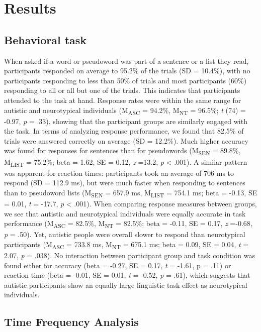 \section*{Results}
\subsection*{Behavioral task}
When asked if a word or pseudoword was part of a sentence or a list they read, participants responded on average to 95.2\% of the trials (SD = 10.4\%), with no participants responding to less than 50\% of trials and most participants (60\%) responding to all or all but one of the trials. This indicates that participants attended to the task at hand. Response rates were within the same range for autistic and neurotypical individuals (M\textsubscript{ASC} = 94.2\%,  M\textsubscript{NT} = 96.5\%; \textit{t} (74) = -0.97, \textit{p} = .33), showing that the participant groups are similarly engaged with the task. In terms of analyzing response performance, we found that 82.5\% of trials were answered correctly on average (SD = 12.2\%). Much higher accuracy was found for responses for sentences than for pseudowords (M\textsubscript{SEN} = 89.8\%,  M\textsubscript{LIST} = 75.2\%; beta = 1.62, SE = 0.12, \textit{z} =13.2, \textit{p} <  .001). A similar pattern was apparent for reaction times: participants took an average of 706 ms to respond (SD = 112.9 ms), but were much faster when responding to sentences than to pseudoword lists (M\textsubscript{SEN} = 657.9 ms,  M\textsubscript{LIST} = 754.1 ms; beta =  -0.13, SE = 0.01, \textit{t} = -17.7, \textit{p} <  .001). When comparing response measures between groups, we see that autistic and neurotypical individuals were equally accurate in task performance  (M\textsubscript{ASC} = 82.5\%,  M\textsubscript{NT} = 82.5\%; beta = -0.11, SE = 0.17, \textit{z} =-0.68, \textit{p} = .50). Yet, autistic people were overall slower to respond than neurotypical participants (M\textsubscript{ASC} = 733.8 ms,  M\textsubscript{NT} = 675.1 ms; beta = 0.09, SE = 0.04, \textit{t} = 2.07, \textit{p} = .038). No interaction between participant group and task condition was found either for accuracy (beta = -0.27, SE = 0.17, \textit{t} = -1.61, p  = .11) or reaction time (beta = -0.01, SE = 0.01, \textit{t} = -0.52, \textit{p} = .61), which suggests that autistic participants show an equally large linguistic task effect as neurotypical individuals.


\subsection*{Time Frequency Analysis}
